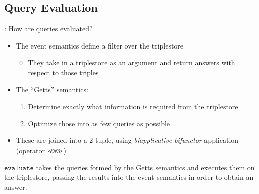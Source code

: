 \documentclass[logoontitle,tabu,supertabular,aspectratio=43]{preney-uwindsor-beamer}
\begin{document}
    \subsection{Query Evaluation}
    \begin{frame}{\insertsection: \insertsubsection}
        How are queries evaluated?
        \begin{itemize}
            \item The event semantics define a filter over the triplestore
            \begin{itemize}
                \item They take in a triplestore as an argument and return answers with respect to those triples
            \end{itemize}
            \item The ``Getts'' semantics:
            \begin{enumerate}
                \item Determine exactly what information is required from the triplestore%
                \item Optimize those into as few queries as possible
            \end{enumerate}
            \item These are joined into a 2-tuple, using {\em biapplicative bifunctor} application (operator $\mathbin{\ll\mkern-8mu*\mkern-8mu\gg}$)
        \end{itemize}
        \begin{block}{}
            $\mathtt{evaluate}$ takes the queries formed by the Getts semantics and executes them on the triplestore, passing the results into the event semantics in order to obtain an answer.
        \end{block}
    \end{frame}
\end{document}
